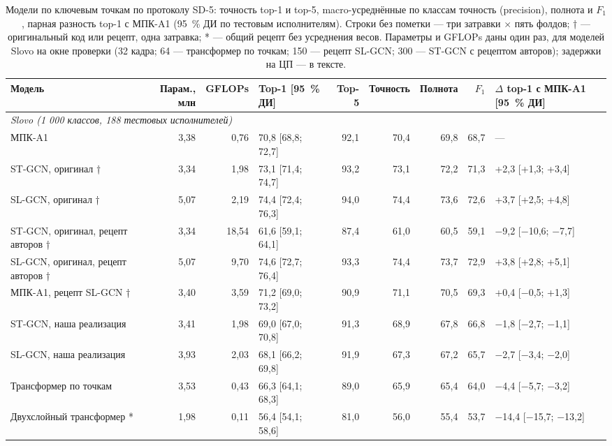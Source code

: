 \documentclass[a4paper,fleqn]{cas-dc}
\begin{document}
\begin{table}[t]
\caption{Модели по ключевым точкам по протоколу SD-5: точность top-1 и top-5, macro-усреднённые по классам точность (precision), полнота и $F_1$, парная разность top-1 с МПК-A1 (95~\% ДИ по тестовым исполнителям). Строки без пометки — три затравки $\times$ пять фолдов; † — оригинальный код или рецепт, одна затравка; * — общий рецепт без усреднения весов. Параметры и GFLOPs даны один раз, для моделей Slovo на окне проверки (32 кадра; 64 — трансформер по точкам; 150 — рецепт SL-GCN; 300 — ST-GCN с рецептом авторов); задержки на ЦП — в тексте.}\label{tab:rsl_main}
\scriptsize\setlength{\tabcolsep}{2pt}
\centering
\begin{tabular}{lrrlrrrrl}
\toprule
\textbf{Модель} & \textbf{Парам., млн} & \textbf{GFLOPs} & \textbf{Top-1 [95~\% ДИ]} & \textbf{Top-5} & \textbf{Точность} & \textbf{Полнота} & \textbf{$F_1$} & \textbf{$\Delta$ top-1 с МПК-A1 [95~\% ДИ]} \\
\midrule
\multicolumn{9}{l}{\textit{Slovo (1 000 классов, 188 тестовых исполнителей)}} \\
МПК-A1 & 3,38 & 0,76 & 70,8 [68,8; 72,7] & 92,1 & 70,4 & 69,8 & 68,7 & --- \\
ST-GCN, оригинал † & 3,34 & 1,98 & 73,1 [71,4; 74,7] & 93,2 & 73,1 & 72,2 & 71,3 & +2,3 [+1,3; +3,4] \\
SL-GCN, оригинал † & 5,07 & 2,19 & 74,4 [72,4; 76,3] & 94,0 & 74,4 & 73,6 & 72,6 & +3,7 [+2,5; +4,8] \\
ST-GCN, оригинал, рецепт авторов † & 3,34 & 18,54 & 61,6 [59,1; 64,1] & 87,4 & 61,0 & 60,5 & 59,1 & $-$9,2 [$-$10,6; $-$7,7] \\
SL-GCN, оригинал, рецепт авторов † & 5,07 & 9,70 & 74,6 [72,7; 76,4] & 93,3 & 74,4 & 73,7 & 72,9 & +3,8 [+2,8; +5,1] \\
МПК-A1, рецепт SL-GCN † & 3,40 & 3,59 & 71,2 [69,0; 73,2] & 90,9 & 71,1 & 70,5 & 69,3 & +0,4 [$-$0,5; +1,3] \\
ST-GCN, наша реализация & 3,41 & 1,98 & 69,0 [67,0; 70,8] & 91,3 & 68,9 & 67,8 & 66,8 & $-$1,8 [$-$2,7; $-$1,1] \\
SL-GCN, наша реализация & 3,93 & 2,03 & 68,1 [66,2; 69,8] & 91,9 & 67,3 & 67,2 & 65,7 & $-$2,7 [$-$3,4; $-$2,0] \\
Трансформер по точкам & 3,53 & 0,43 & 66,3 [64,1; 68,3] & 89,0 & 65,9 & 65,4 & 64,0 & $-$4,4 [$-$5,7; $-$3,2] \\
Двухслойный трансформер * & 1,98 & 0,11 & 56,4 [54,1; 58,6] & 81,0 & 56,0 & 55,4 & 53,7 & $-$14,4 [$-$15,7; $-$13,2] \\

\end{tabular}
\end{table}
\end{document}

